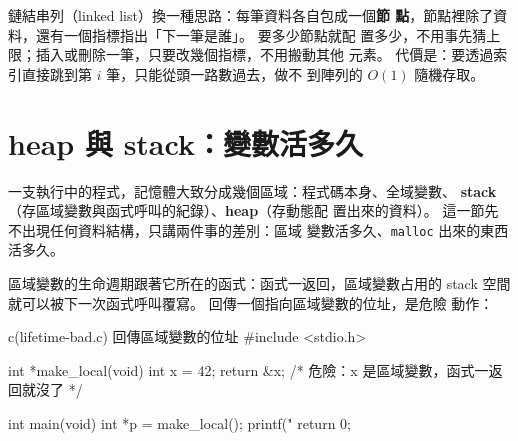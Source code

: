 鏈結串列（linked list）換一種思路：每筆資料各自包成一個\textbf{節
點}，節點裡除了資料，還有一個指標指出「下一筆是誰」。 要多少節點就配
置多少，不用事先猜上限；插入或刪除一筆，只要改幾個指標，不用搬動其他
元素。 代價是：要透過索引直接跳到第 $i$ 筆，只能從頭一路數過去，做不
到陣列的 $O(1)$ 隨機存取。


\section{heap 與 stack：變數活多久}
\label{sec:ds-heap-stack}

一支執行中的程式，記憶體大致分成幾個區域：程式碼本身、全域變數、
\textbf{stack}（存區域變數與函式呼叫的紀錄）、\textbf{heap}（存動態配
置出來的資料）。 這一節先不出現任何資料結構，只講兩件事的差別：區域
變數活多久、\texttt{malloc} 出來的東西活多久。

\begin{center}
\label{fig:ds-memory-layout}
\end{center}

區域變數的生命週期跟著它所在的函式：函式一返回，區域變數占用的 stack
空間就可以被下一次函式呼叫覆寫。 回傳一個指向區域變數的位址，是危險
動作：

\begin{example}{c}{(lifetime-bad.c) 回傳區域變數的位址}
#include <stdio.h>

int *make_local(void) {
    int x = 42;
    return &x; /* 危險：x 是區域變數，函式一返回就沒了 */
}

int main(void) {
    int *p = make_local();
    printf("%
    return 0;
}
\end{example}

